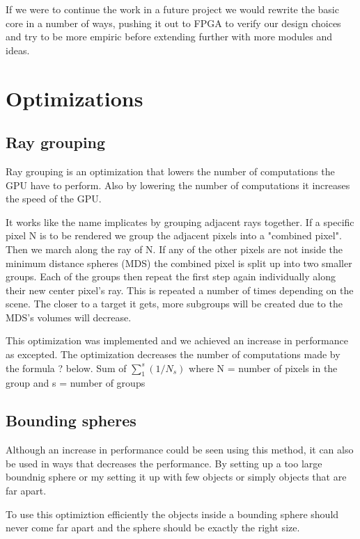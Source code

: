 			If we were to continue the work in a future project we would
			rewrite the basic core in a number of ways, pushing it out to FPGA
			to verify our design choices and try to be more empiric before
			extending further with more modules and ideas. 

	\section{Optimizations} \label{optimization}

		\subsection{Ray grouping}
		
			Ray grouping is an optimization that lowers the number of
			computations the GPU have to perform. Also by lowering the number
			of computations it increases the speed of the GPU.
			
			It works like the name implicates by grouping adjacent rays
			together. If a specific pixel N is to be rendered we group the
			adjacent pixels into a "combined pixel". Then we march along the
			ray of N. If any of the other pixels are not inside the minimum
			distance spheres (MDS) the combined pixel is split up into two
			smaller groups. Each of the groups then repeat the first step again
			individually along their new center pixel's ray. This is repeated a
			number of times depending on the scene.  The closer to a target it
			gets, more subgroups will be created due to the MDS's volumes will
			decrease.
			
			This optimization was implemented and we achieved an increase in
			performance as excepted. The optimization decreases the number of
			computations made by the formula ? below.  Sum of $\sum_1^s(1/N_s)$
			where N = number of pixels in the group and s = number of groups


		\subsection{Bounding spheres}
			
			Although an increase in performance could be seen using this
			method, it can also be used in ways that decreases the performance.
			By setting up a too large boundnig sphere or my setting it up with
			few objects or simply objects that are far apart.

			To use this optimiztion efficiently the objects inside a bounding 
			sphere should never come far apart and the sphere should be exactly 
			the right size.

